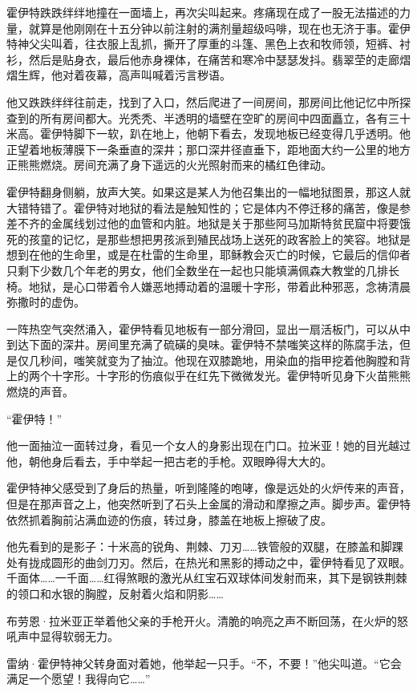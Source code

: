\documentclass[AutoFakeBold=true]{book}
\begin{document}
霍伊特跌跌绊绊地撞在一面墙上，再次尖叫起来。疼痛现在成了一股无法描述的力量，就算是他刚刚在十五分钟以前注射的满剂量超级吗啡，现在也无济于事。霍伊特神父尖叫着，往衣服上乱抓，撕开了厚重的斗篷、黑色上衣和牧师领，短裤、衬衫，然后是贴身衣，最后他赤身裸体，在痛苦和寒冷中瑟瑟发抖。翡翠茔的走廊熠熠生辉，他对着夜幕，高声叫喊着污言秽语。

他又跌跌绊绊往前走，找到了入口，然后爬进了一间房间，那房间比他记忆中所探查到的所有房间都大。光秃秃、半透明的墙壁在空旷的房间中四面矗立，各有三十米高。霍伊特脚下一软，趴在地上，他朝下看去，发现地板已经变得几乎透明。他正望着地板薄膜下一条垂直的深井；那口深井径直垂下，距地面大约一公里的地方正熊熊燃烧。房间充满了身下遥远的火光照射而来的橘红色律动。

霍伊特翻身侧躺，放声大笑。如果这是某人为他召集出的一幅地狱图景，那这人就大错特错了。霍伊特对地狱的看法是触知性的；它是体内不停迁移的痛苦，像是参差不齐的金属线划过他的血管和内脏。地狱是关于那些阿马加斯特贫民窟中将要饿死的孩童的记忆，是那些想把男孩派到殖民战场上送死的政客脸上的笑容。地狱是想到在他的生命里，或是在杜雷的生命里，耶稣教会灭亡的时候，它最后的信仰者只剩下少数几个年老的男女，他们全数坐在一起也只能填满佩森大教堂的几排长椅。地狱，是心口带着令人嫌恶地搏动着的温暖十字形，带着此种邪恶，念祷清晨弥撒时的虚伪。

一阵热空气突然涌入，霍伊特看见地板有一部分滑回，显出一扇活板门，可以从中到达下面的深井。房间里充满了硫磺的臭味。霍伊特不禁嗤笑这样的陈腐手法，但是仅几秒间，嗤笑就变为了抽泣。他现在双膝跪地，用染血的指甲挖着他胸膛和背上的两个十字形。十字形的伤痕似乎在红先下微微发光。霍伊特听见身下火苗熊熊燃烧的声音。

``霍伊特！''

他一面抽泣一面转过身，看见一个女人的身影出现在门口。拉米亚！她的目光越过他，朝他身后看去，手中举起一把古老的手枪。双眼睁得大大的。

霍伊特神父感受到了身后的热量，听到隆隆的咆哮，像是远处的火炉传来的声音，但是在那声音之上，他突然听到了石头上金属的滑动和摩擦之声。脚步声。霍伊特依然抓着胸前沾满血迹的伤痕，转过身，膝盖在地板上擦破了皮。

他先看到的是影子：十米高的锐角、荆棘、刀刃……铁管般的双腿，在膝盖和脚踝处有拢成圆形的曲剑刀刃。然后，在热光和黑影的搏动之中，霍伊特看见了双眼。千面体……一千面……红得煞眼的激光从红宝石双球体间发射而来，其下是钢铁荆棘的领口和水银的胸膛，反射着火焰和阴影……

布劳恩·拉米亚正举着他父亲的手枪开火。清脆的响亮之声不断回荡，在火炉的怒吼声中显得软弱无力。

雷纳·霍伊特神父转身面对着她，他举起一只手。``不，不要！''他尖叫道。``它会满足一个愿望！我得向它……''
\end{document}
